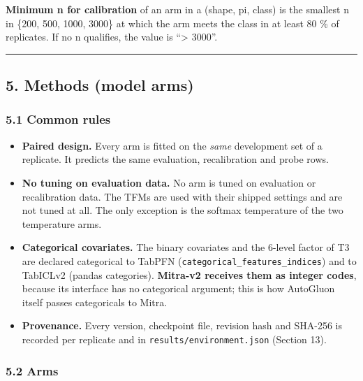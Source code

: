 \documentclass[
  10pt,
]{article}
\providecommand{\tightlist}{%
  \setlength{\itemsep}{0pt}\setlength{\parskip}{0pt}}
\begin{document}
\textbf{Minimum n for calibration} of an arm in a (shape,
pi, class) is the smallest n in \{200, 500, 1000, 3000\} at
which the arm meets the class in at least 80 \% of
replicates. If no n qualifies, the value is ``\textgreater{}
3000''.

\begin{center}\rule{0.5\linewidth}{0.5pt}\end{center}

\subsection{5. Methods (model
arms)}\label{methods-model-arms}

\subsubsection{5.1 Common rules}\label{common-rules}

\begin{itemize}
\tightlist
\item
  \textbf{Paired design.} Every arm is fitted on the
  \emph{same} development set of a replicate. It predicts
  the same evaluation, recalibration and probe rows.
\item
  \textbf{No tuning on evaluation data.} No arm is tuned on
  evaluation or recalibration data. The TFMs are used with
  their shipped settings and are not tuned at all. The only
  exception is the softmax temperature of the two
  temperature arms.
\item
  \textbf{Categorical covariates.} The binary covariates and
  the 6-level factor of T3 are declared categorical to
  TabPFN (\texttt{categorical\_features\_indices}) and to
  TabICLv2 (pandas categories). \textbf{Mitra-v2 receives
  them as integer codes}, because its interface has no
  categorical argument; this is how AutoGluon itself passes
  categoricals to Mitra.
\item
  \textbf{Provenance.} Every version, checkpoint file,
  revision hash and SHA-256 is recorded per replicate and in
  \texttt{results/environment.json} (Section 13).
\end{itemize}

\subsubsection{5.2 Arms}\label{arms}
\end{document}
